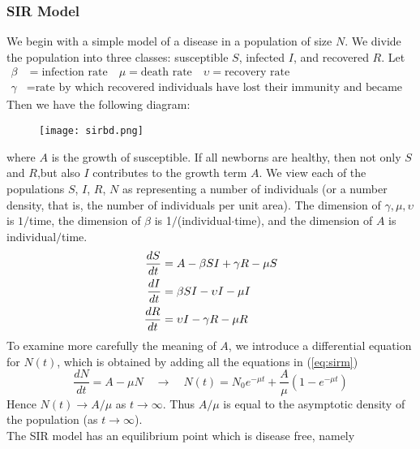 \subsubsection{SIR Model}
We begin with a simple model of a disease in a population of size $N$.
We divide the population into three classes: susceptible $S$, infected $I$, and recovered $R$.
Let
\begin{equation*}
	\begin{aligned}
		\beta&=\text{infection rate}\quad\mu=\text{death rate}\quad\upsilon=\text{recovery rate}\\
		\gamma&=\text{rate by which recovered individuals have lost their immunity and became susceptible to the disease.}
	\end{aligned}
\end{equation*}
Then we have the following diagram:
\begin{figure}[H]
	\centering
	\texttt{[image: sirbd.png]}
	\label{fig:sirbd}
\end{figure}
where $A$ is the growth of susceptible.
If all newborns are healthy, then not only $S$ and $R$,but also $I$ contributes to the growth term $A$.
We view each of the populations $S$, $I$, $R$, $N$ as representing a number of individuals (or a number density, that is, the number of individuals per unit area).
The dimension of $\gamma,\mu,\upsilon$ is $1/$time, the dimension of $\beta$ is 1$/$(individual$\cdot$time), and the dimension of $A$ is individual$/$time.
\begin{equation}{\label{eq:sirm}}
	\begin{aligned}
		\frac{dS}{dt}&=A-\beta SI+\gamma R-\mu S\\
		\frac{dI}{dt}&=\beta SI-\upsilon I-\mu I\\
		\frac{dR}{dt}&=\upsilon I-\gamma R-\mu R
	\end{aligned}
\end{equation}
To examine more carefully the meaning of $A$, we introduce a differential equation
for $N(t)$, which is obtained by adding all the equations in (\ref{eq:sirm})
\begin{equation}
	\frac{dN}{dt}=A-\mu N\quad\rightarrow\quad N(t)=N_0e^{-\mu t}+\frac{A}{\mu}(1-e^{-\mu t})
\end{equation}
Hence $N(t)\rightarrow A/\mu$ as $t\rightarrow\infty$. Thus $A/\mu$ is equal to the asymptotic density of the population (as $t\rightarrow\infty$).\\
The SIR model has an equilibrium point which is disease free, namely

